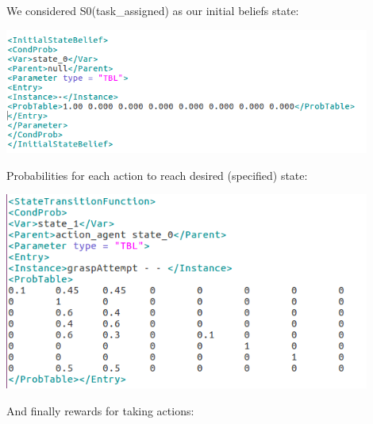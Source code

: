 We considered S0(task\_assigned) as our initial beliefs state:

\begin{minipage}{0.8\textwidth}
\centering
	\includegraphics[width=12cm]{Pictures/func/MDP/MDP2.png}
	\label{fig:MDP2}
\end{minipage}

Probabilities for each action to reach desired (specified) state:

\begin{minipage}{0.8\textwidth}
\centering
	\includegraphics[width=12cm]{Pictures/func/MDP/MDP3.png}
	\label{fig:MDP3}
\end{minipage}

And finally rewards for taking actions:

